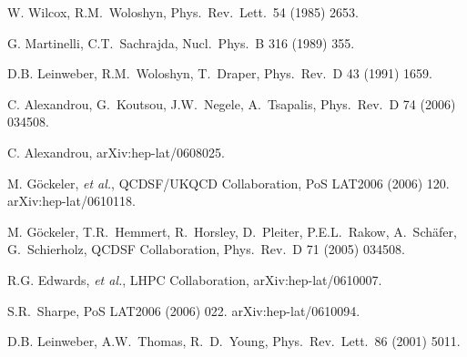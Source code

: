 \begin{thebibliography}{PPV06}
  W. Wilcox, R.M.~Woloshyn,
  Phys.\ Rev.\ Lett.\   54 (1985) 2653.

  G. Martinelli, C.T.~Sachrajda,
  Nucl.\ Phys.\ B  316 (1989) 355.

  D.B. Leinweber, R.M.~Woloshyn, T.~Draper,
  Phys.\ Rev.\ D  43 (1991) 1659.

C. Alexandrou, G.~Koutsou, J.W.~Negele, A.~Tsapalis,
  Phys.\ Rev.\ D 74 (2006) 034508.

  C. Alexandrou,
  arXiv:hep-lat/0608025.

  M. G\"ockeler, {\it et al.}, QCDSF/UKQCD Collaboration,
PoS  LAT2006 (2006) 120. arXiv:hep-lat/0610118.

M. G\"ockeler, T.R.~Hemmert, R.~Horsley, D.~Pleiter, P.E.L.~Rakow, 
A.~Sch\"afer, G.~Schierholz, QCDSF Collaboration,
  Phys.\ Rev.\ D  71 (2005) 034508.

R.G. Edwards, {\it et al.}, LHPC Collaboration,
  arXiv:hep-lat/0610007.

  S.R.~Sharpe,
  PoS  LAT2006 (2006) 022. arXiv:hep-lat/0610094.

  D.B. Leinweber, A.W.~Thomas, R.~D.~Young,
  Phys.\ Rev.\ Lett.\   86 (2001) 5011. 


\end{thebibliography}
